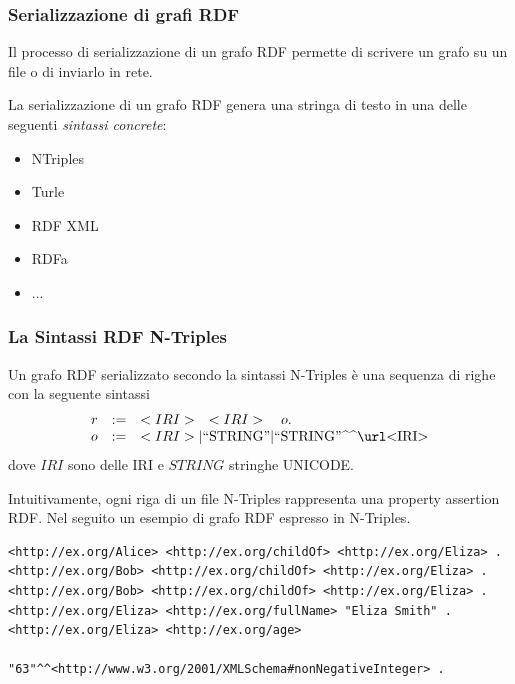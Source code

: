 \documentclass[8pt]{beamer}
\begin{document}
% 
\begin{frame}
 \frametitle{Serializzazione di grafi RDF}
 
 Il processo di serializzazione di un grafo RDF permette
 di scrivere un grafo su un file o di inviarlo in rete.
 \vspace{\baselineskip}
 
 La serializzazione di un grafo RDF genera una stringa di testo
 in una delle seguenti \emph{sintassi concrete}:
 \begin{itemize}
  \item NTriples
  \item Turle
  \item RDF XML
  \item RDFa
  \item ...
 \end{itemize}
\end{frame} 

\begin{frame}[fragile]
 \frametitle{La Sintassi RDF N-Triples}
 
 Un grafo RDF serializzato secondo la sintassi N-Triples \`e
 una sequenza di righe con la seguente sintassi
\[
\begin{array}{rcl}
 r & := & <IRI> \quad <IRI> \quad o . \\
 o & := & <IRI> | \stringLiteral{STRING} | \literal{STRING}{<IRI>}
\end{array} 
\]
dove $IRI$ sono delle IRI e $STRING$ stringhe UNICODE.
\vspace{\baselineskip}

Intuitivamente, ogni riga di un file N-Triples rappresenta 
una property assertion RDF. Nel seguito un esempio di grafo
RDF espresso in N-Triples.
\vspace{\baselineskip}


\begin{Verbatim}[fontsize=\small]
<http://ex.org/Alice> <http://ex.org/childOf> <http://ex.org/Eliza> .
<http://ex.org/Bob> <http://ex.org/childOf> <http://ex.org/Eliza> .
<http://ex.org/Bob> <http://ex.org/childOf> <http://ex.org/Eliza> .
<http://ex.org/Eliza> <http://ex.org/fullName> "Eliza Smith" .
<http://ex.org/Eliza> <http://ex.org/age> 
                        "63"^^<http://www.w3.org/2001/XMLSchema#nonNegativeInteger> .
\end{Verbatim}
\end{frame}
\end{document}
